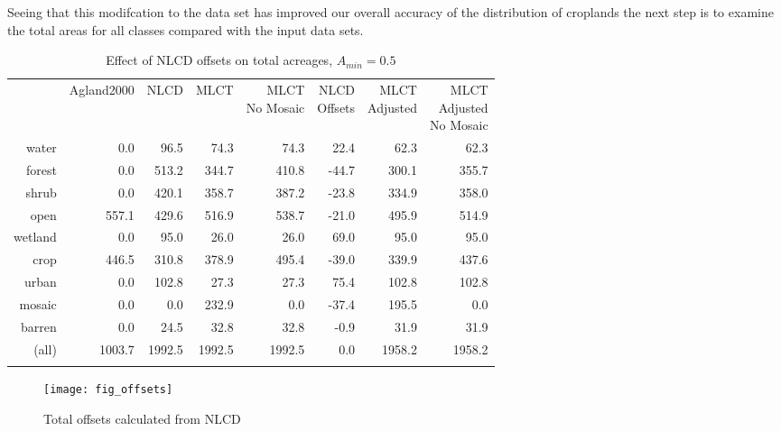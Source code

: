 Seeing that this modifcation to the data set has improved our overall
accuracy of the distribution of croplands the next step is to examine
the total areas for all classes compared with the input data sets.  


\begin{table}[ht]
\begin{center}
{\small
\begin{tabular}{rrrrrrrr}
  \hline
 & Agland2000 & NLCD & MLCT & \pbox[c][][c]{3in}{MLCT\\No Mosaic} & \pbox[c][][c]{3in}{NLCD\\Offsets} & \pbox[c][][c]{3in}{MLCT\\Adjusted} & \pbox[c][][c]{3in}{\smallskip{}MLCT\\Adjusted\\No Mosaic} \\ 
  \noalign{\smallskip} \hline
water & 0.0 & 96.5 & 74.3 & 74.3 & 22.4 & 62.3 & 62.3 \\ 
  forest & 0.0 & 513.2 & 344.7 & 410.8 & -44.7 & 300.1 & 355.7 \\ 
  shrub & 0.0 & 420.1 & 358.7 & 387.2 & -23.8 & 334.9 & 358.0 \\ 
  open & 557.1 & 429.6 & 516.9 & 538.7 & -21.0 & 495.9 & 514.9 \\ 
  wetland & 0.0 & 95.0 & 26.0 & 26.0 & 69.0 & 95.0 & 95.0 \\ 
  crop & 446.5 & 310.8 & 378.9 & 495.4 & -39.0 & 339.9 & 437.6 \\ 
  urban & 0.0 & 102.8 & 27.3 & 27.3 & 75.4 & 102.8 & 102.8 \\ 
  mosaic & 0.0 & 0.0 & 232.9 & 0.0 & -37.4 & 195.5 & 0.0 \\ 
  barren & 0.0 & 24.5 & 32.8 & 32.8 & -0.9 & 31.9 & 31.9 \\ 
  (all) & 1003.7 & 1992.5 & 1992.5 & 1992.5 & 0.0 & 1958.2 & 1958.2 \\ 
   \noalign{\smallskip} \hline
\end{tabular}
}
\caption{Effect of NLCD offsets on total acreages, $A_{min}=0.5$}
\label{tab:areas2}
\end{center}
\end{table}
\begin{figure}[hpt]
  \centering

 

  \texttt{[image: fig\_offsets]}
  \caption{Total offsets calculated from NLCD}
  \label{fig:offsets}
\end{figure}


